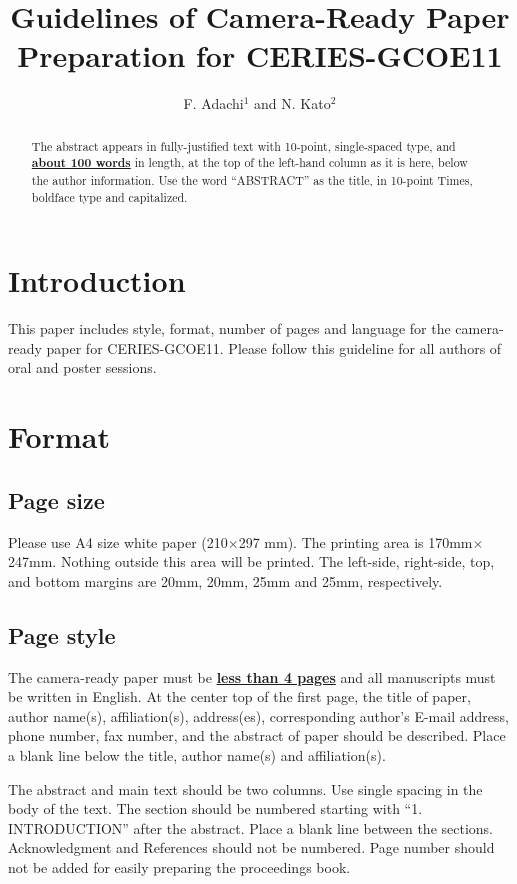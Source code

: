 \documentclass[10pt]{article}
\title{Guidelines of Camera-Ready Paper Preparation for
  CERIES-GCOE11}
\author{
  F. Adachi$^1$ and N. Kato$^2$
}
\begin{document}
\maketitle

\begin{abstract}
  The abstract appears in fully-justified text with
  10-point, single-spaced type, and \underline{\bf about 100
    words} in length, at the top of the left-hand column as
  it is here, below the author information. Use the word
  ``ABSTRACT'' as the title, in 10-point Times, boldface
  type and capitalized.
\end{abstract}

\section{Introduction}

This paper includes style, format, number of pages and
language for the camera-ready paper for CERIES-GCOE11. Please
follow this guideline for all authors of oral and poster
sessions.

\section{Format}

\subsection{Page size}

Please use A4 size white paper (210$\times$297 mm). The
printing area is 170mm$\times$247mm. Nothing outside this
area will be printed. The left-side, right-side, top, and
bottom margins are 20mm, 20mm, 25mm and 25mm, respectively.

\subsection{Page style}

The camera-ready paper must be \underline{\bf less than 4
  pages} and all manuscripts must be written in English. At
the center top of the first page, the title of paper, author
name(s), affiliation(s), address(es), corresponding author's
E-mail address, phone number, fax number, and the abstract
of paper should be described. Place a blank line below the
title, author name(s) and affiliation(s).

The abstract and main text should be two columns. Use single
spacing in the body of the text. The section should be
numbered starting with ``1. INTRODUCTION'' after the
abstract. Place a blank line between the sections.
Acknowledgment and References should not be numbered. Page
number should not be added for easily preparing the
proceedings book.
\end{document}
